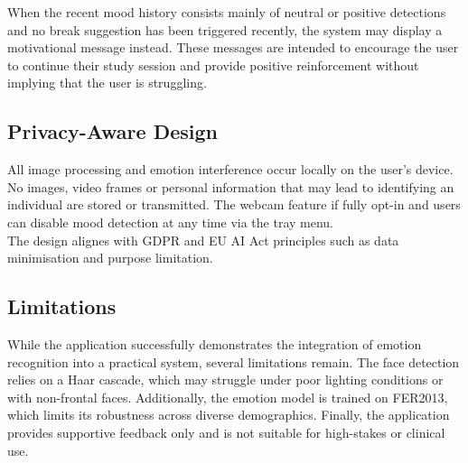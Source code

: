 \documentclass[12pt,a4paper]{article}
\begin{document}
When the recent mood history consists mainly of neutral or positive detections and no break suggestion has been triggered recently, the system may display a motivational message instead. These messages are intended to encourage the user to continue their study session and provide positive reinforcement without implying that the user is struggling.
\subsection{Privacy-Aware Design}
All image processing and emotion interference occur locally on the user's device. No images, video frames or personal information that may lead to identifying an individual are stored or transmitted. The webcam feature if fully opt-in and users can disable mood detection at any time via the tray menu.\\
The design alignes with GDPR and EU AI Act principles such as data minimisation and purpose limitation.
\subsection{Limitations}
While the application successfully demonstrates the integration of emotion recognition into a practical system, several limitations remain. The face detection relies on a Haar cascade, which may struggle under poor lighting conditions or with non-frontal faces. Additionally, the emotion model is trained on FER2013, which limits its robustness across diverse demographics. Finally, the application provides supportive feedback only and is not suitable for high-stakes or clinical use.
\end{document}
